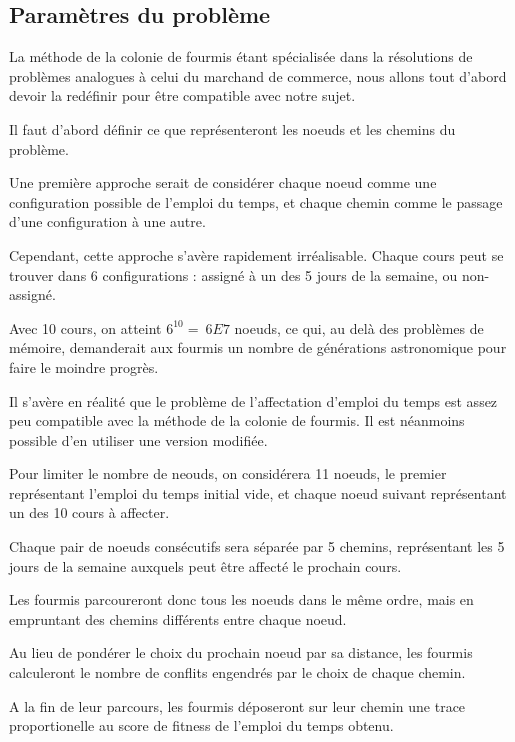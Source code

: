 
\subsection {Paramètres du problème}

La méthode de la colonie de fourmis étant spécialisée dans la résolutions de problèmes analogues à celui du marchand de commerce, nous allons tout d'abord devoir la redéfinir pour être compatible avec notre sujet.

Il faut d'abord définir ce que représenteront les noeuds et les chemins du problème.

Une première approche serait de considérer chaque noeud comme une configuration possible de l'emploi du temps, et chaque chemin comme le passage d'une configuration à une autre.

Cependant, cette approche s'avère rapidement irréalisable. Chaque cours peut se trouver dans 6 configurations : assigné à un des 5 jours de la semaine, ou non-assigné.

Avec 10 cours, on atteint $6^10 = ~6E7$ noeuds, ce qui, au delà des problèmes de mémoire, demanderait aux fourmis un nombre de générations astronomique pour faire le moindre progrès.

Il s'avère en réalité que le problème de l'affectation d'emploi du temps est assez peu compatible avec la méthode de la colonie de fourmis. Il est néanmoins possible d'en utiliser une version modifiée.

Pour limiter le nombre de neouds, on considérera 11 noeuds, le premier représentant l'emploi du temps initial vide, et chaque noeud suivant représentant un des 10 cours à affecter.

Chaque pair de noeuds consécutifs sera séparée par 5 chemins, représentant les 5 jours de la semaine auxquels peut être affecté le prochain cours.

Les fourmis parcoureront donc tous les noeuds dans le même ordre, mais en empruntant des chemins différents entre chaque noeud.

Au lieu de pondérer le choix du prochain noeud par sa distance, les fourmis calculeront le nombre de conflits engendrés par le choix de chaque chemin.

A la fin de leur parcours, les fourmis déposeront sur leur chemin une trace proportionelle au score de fitness de l'emploi du temps obtenu.

